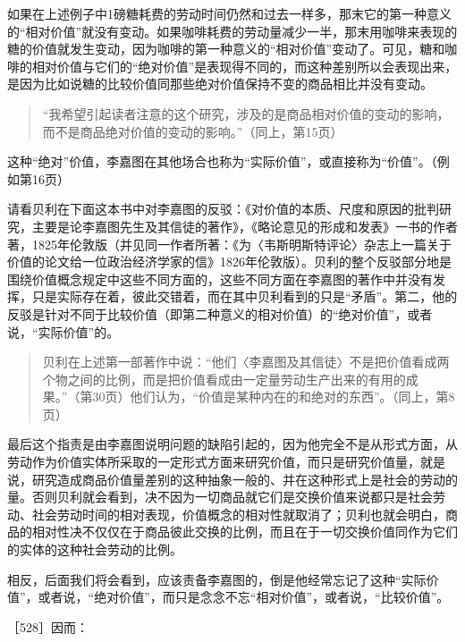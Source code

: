 如果在上述例子中1磅糖耗费的劳动时间仍然和过去一样多，那末它的第一种意义的“相对价值”就没有变动。如果咖啡耗费的劳动量减少一半，那末用咖啡来表现的糖的价值就发生变动，因为咖啡的第一种意义的“相对价值”变动了。可见，糖和咖啡的相对价值与它们的“绝对价值”是表现得不同的，而这种差别所以会表现出来，是因为比如说糖的比较价值同那些绝对价值保持不变的商品相比并没有变动。

\begin{quote}{“我希望引起读者注意的这个研究，涉及的是商品相对价值的变动的影响，而不是商品绝对价值的变动的影响。”（同上，第15页）}\end{quote}

这种“绝对”价值，李嘉图在其他场合也称为“实际价值”，或直接称为“价值”。（例如第16页）

请看贝利在下面这本书中对李嘉图的反驳：《对价值的本质、尺度和原因的批判研究，主要是论李嘉图先生及其信徒的著作》，《略论意见的形成和发表》一书的作者著，1825年伦敦版（并见同一作者所著：《为〈韦斯明斯特评论〉杂志上一篇关于价值的论文给一位政治经济学家的信》1826年伦敦版）。贝利的整个反驳部分地是围绕价值概念规定中这些不同方面的，这些不同方面在李嘉图的著作中并没有发挥，只是实际存在着，彼此交错着，而在其中贝利看到的只是“矛盾”。第二，他的反驳是针对不同于比较价值（即第二种意义的相对价值）的“绝对价值”，或者说，“实际价值”的。

\begin{quote}{贝利在上述第一部著作中说：“他们〈李嘉图及其信徒〉不是把价值看成两个物之间的比例，而是把价值看成由一定量劳动生产出来的有用的成果。”（第30页）他们认为，“价值是某种内在的和绝对的东西”。（同上，第8页）}\end{quote}

最后这个指责是由李嘉图说明问题的缺陷引起的，因为他完全不是从形式方面，从劳动作为价值实体所采取的一定形式方面来研究价值，而只是研究价值量，就是说，研究造成商品价值量差别的这种抽象一般的、并在这种形式上是社会的劳动的量。否则贝利就会看到，决不因为一切商品就它们是交换价值来说都只是社会劳动、社会劳动时间的相对表现，价值概念的相对性就取消了；贝利也就会明白，商品的相对性决不仅仅在于商品彼此交换的比例，而且在于一切交换价值同作为它们的实体的这种社会劳动的比例。

相反，后面我们将会看到，应该责备李嘉图的，倒是他经常忘记了这种“实际价值”，或者说，“绝对价值”，而只是念念不忘“相对价值”，或者说，“比较价值”。

［528］因而：



